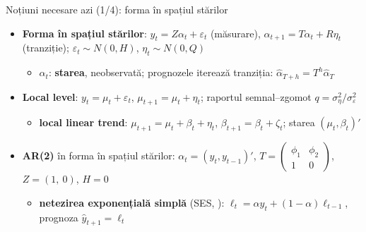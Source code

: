 \begin{frame}{Noțiuni necesare azi (1/4): forma în spațiul stărilor}
\itemsize{\small}
\begin{itemize}
    \item \textbf{Forma în spațiul stărilor}: $y_t = Z\alpha_t + \varepsilon_t$ (măsurare), $\alpha_{t+1} = T\alpha_t + R\eta_t$ (tranziție); $\varepsilon_t \sim N(0, H)$, $\eta_t \sim N(0, Q)$
    \begin{itemize}
        \item $\alpha_t$: \textbf{starea}, neobservată; prognozele iterează tranziția: $\hat\alpha_{T+h} = T^h\hat\alpha_T$
    \end{itemize}
    \item \textbf{Local level}: $y_t = \mu_t + \varepsilon_t$, $\mu_{t+1} = \mu_t + \eta_t$; raportul semnal--zgomot $q = \sigma^2_\eta/\sigma^2_\varepsilon$
    \begin{itemize}
        \item \textbf{local linear trend}: $\mu_{t+1} = \mu_t + \beta_t + \eta_t$, $\beta_{t+1} = \beta_t + \zeta_t$; starea $(\mu_t, \beta_t)'$
    \end{itemize}
    \item \textbf{AR(2)} în forma în spațiul stărilor: $\alpha_t = (y_t, y_{t-1})'$, $T = \begin{pmatrix}\phi_1 & \phi_2\\ 1 & 0\end{pmatrix}$, $Z = (1,\ 0)$, $H = 0$
    \begin{itemize}
        \item \textbf{netezirea exponențială simplă} (SES, ): $\ell_t = \alpha y_t + (1-\alpha)\ell_{t-1}$, prognoza $\hat y_{t+1} = \ell_t$
    \end{itemize}
\end{itemize}
\end{frame}

